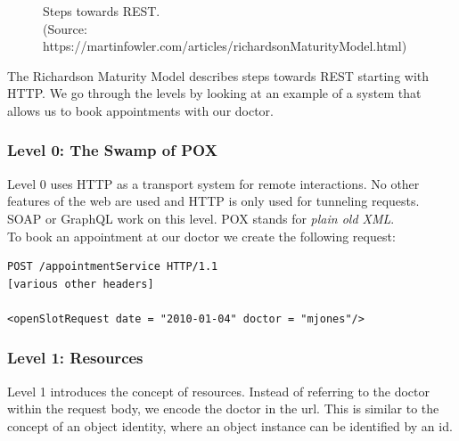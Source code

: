 \begin{figure}[!htb]
  \caption{Steps towards REST. \\ (Source: https://martinfowler.com/articles/richardsonMaturityModel.html)}
\end{figure}

The Richardson Maturity Model describes steps towards REST starting with HTTP. We go through the levels by looking at an example of a system that allows us to book appointments with our doctor.

\subsubsection{Level 0: The Swamp of POX}
Level 0 uses HTTP as a transport system for remote interactions. No other features of the web are used and HTTP is only used for tunneling requests. SOAP or GraphQL work on this level. POX stands for \textit{plain old XML}. \\
To book an appointment at our doctor we create the following request:

\lstset{language=XML}
\begin{lstlisting}[caption=Level 0: \gls{remoteprocedurecall} on HTTP]
POST /appointmentService HTTP/1.1
[various other headers]

<openSlotRequest date = "2010-01-04" doctor = "mjones"/>
\end{lstlisting}

\subsubsection{Level 1: Resources}
Level 1 introduces the concept of resources. Instead of referring to the doctor within the request body, we encode the doctor in the \gls{url}. This is similar to the concept of an object identity, where an object instance can be identified by an id.

